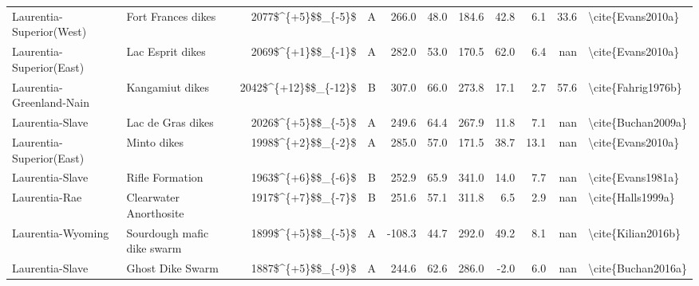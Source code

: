 \begin{longtable}{p{1 in}p{1 in}rrrrrrrr}
      Laurentia-Superior(West) &                               Fort Frances dikes &     2077\$\textasciicircum \{+5\}\$\$\_\{-5\}\$ &      A &     266.0 &      48.0 & 184.6 &  42.8 &       6.1 &        33.6 &                                  \textbackslash cite\{Evans2010a\} \\
      Laurentia-Superior(East) &                                 Lac Esprit dikes &     2069\$\textasciicircum \{+1\}\$\$\_\{-1\}\$ &      A &     282.0 &      53.0 & 170.5 &  62.0 &       6.4 &         nan &                                  \textbackslash cite\{Evans2010a\} \\
      Laurentia-Greenland-Nain &                                  Kangamiut dikes &   2042\$\textasciicircum \{+12\}\$\$\_\{-12\}\$ &      B &     307.0 &      66.0 & 273.8 &  17.1 &       2.7 &        57.6 &                                 \textbackslash cite\{Fahrig1976b\} \\
               Laurentia-Slave &                                Lac de Gras dikes &     2026\$\textasciicircum \{+5\}\$\$\_\{-5\}\$ &      A &     249.6 &      64.4 & 267.9 &  11.8 &       7.1 &         nan &                                 \textbackslash cite\{Buchan2009a\} \\
      Laurentia-Superior(East) &                                      Minto dikes &     1998\$\textasciicircum \{+2\}\$\$\_\{-2\}\$ &      A &     285.0 &      57.0 & 171.5 &  38.7 &      13.1 &         nan &                                  \textbackslash cite\{Evans2010a\} \\
               Laurentia-Slave &                                  Rifle Formation &     1963\$\textasciicircum \{+6\}\$\$\_\{-6\}\$ &      B &     252.9 &      65.9 & 341.0 &  14.0 &       7.7 &         nan &                                  \textbackslash cite\{Evans1981a\} \\
                 Laurentia-Rae &                           Clearwater Anorthosite &     1917\$\textasciicircum \{+7\}\$\$\_\{-7\}\$ &      B &     251.6 &      57.1 & 311.8 &   6.5 &       2.9 &         nan &                                  \textbackslash cite\{Halls1999a\} \\
             Laurentia-Wyoming &                       Sourdough mafic dike swarm &     1899\$\textasciicircum \{+5\}\$\$\_\{-5\}\$ &      A &    -108.3 &      44.7 & 292.0 &  49.2 &       8.1 &         nan &                                 \textbackslash cite\{Kilian2016b\} \\
               Laurentia-Slave &                                 Ghost Dike Swarm &     1887\$\textasciicircum \{+5\}\$\$\_\{-9\}\$ &      A &     244.6 &      62.6 & 286.0 &  -2.0 &       6.0 &         nan &                                 \textbackslash cite\{Buchan2016a\} \\

\end{longtable}
